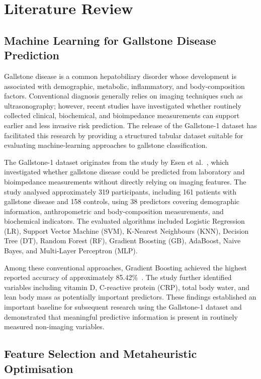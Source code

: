\section{Literature Review}
\label{sec:literature_review}

\subsection{Machine Learning for Gallstone Disease Prediction}

Gallstone disease is a common hepatobiliary disorder whose development is associated with demographic, metabolic, inflammatory, and body-composition factors. Conventional diagnosis generally relies on imaging techniques such as ultrasonography; however, recent studies have investigated whether routinely collected clinical, biochemical, and bioimpedance measurements can support earlier and less invasive risk prediction. The release of the Gallstone-1 dataset has facilitated this research by providing a structured tabular dataset suitable for evaluating machine-learning approaches to gallstone classification.

The Gallstone-1 dataset originates from the study by Esen et al.~\cite{esen2024early}, which investigated whether gallstone disease could be predicted from laboratory and bioimpedance measurements without directly relying on imaging features. The study analysed approximately 319 participants, including 161 patients with gallstone disease and 158 controls, using 38 predictors covering demographic information, anthropometric and body-composition measurements, and biochemical indicators. The evaluated algorithms included Logistic Regression (LR), Support Vector Machine (SVM), K-Nearest Neighbours (KNN), Decision Tree (DT), Random Forest (RF), Gradient Boosting (GB), AdaBoost, Naive Bayes, and Multi-Layer Perceptron (MLP).

Among these conventional approaches, Gradient Boosting achieved the highest reported accuracy of approximately 85.42\%~\cite{esen2024early}. The study further identified variables including vitamin D, C-reactive protein (CRP), total body water, and lean body mass as potentially important predictors. These findings established an important baseline for subsequent research using the Gallstone-1 dataset and demonstrated that meaningful predictive information is present in routinely measured non-imaging variables.

\subsection{Feature Selection and Metaheuristic Optimisation}


